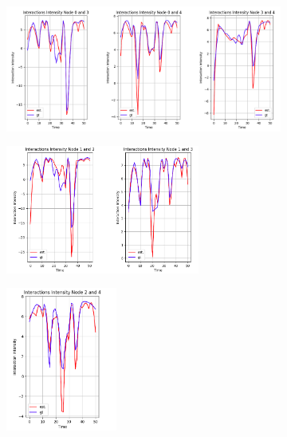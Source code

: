 \begin{figure}
    \begin{subfigure}[b]{\textwidth}
        \centering
        \includegraphics[width=\textwidth]{0_images/10step_SCVM_dyad_removal_plot3.png}
    \end{subfigure}
    \vfill
    \begin{subfigure}[b]{\textwidth}
        \includegraphics[width=0.7\textwidth]{0_images/10step_SCVM_dyad_removal_plot4.png}
    \end{subfigure}
    \hfill
    \begin{subfigure}[b]{\textwidth}
        \includegraphics[width=0.4\textwidth]{0_images/10step_SCVM_dyad_removal_plot5.png}
    \end{subfigure}
\end{figure}
